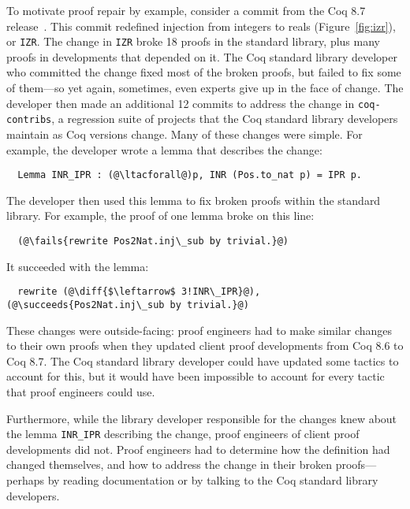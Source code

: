 To motivate proof repair by example, consider a commit from the Coq 8.7 release~\cite{coq87commit}.
This commit redefined injection from integers to reals (Figure~\ref{fig:izr}), or \lstinline{IZR}.
The change in \lstinline{IZR} broke 18 proofs in the standard library, plus many proofs in developments
that depended on it.
The Coq standard library developer who committed the change fixed most of the broken proofs,
but failed to fix some of them---so yet again, sometimes, even experts give up in the face of change. %
The developer then made an additional 12 commits to address the change in \lstinline{coq-contribs},
a regression suite of projects that the Coq standard library developers maintain as Coq versions change.
Many of these changes were simple. For example, the developer wrote a lemma that describes the change:

\lstset{language=coq, aboveskip=3pt, belowskip=3pt}
\begin{lstlisting}
  Lemma INR_IPR : (@\ltacforall@)p, INR (Pos.to_nat p) = IPR p.
\end{lstlisting}
The developer then used this lemma to fix broken proofs within the standard library. 
For example, the proof of one lemma broke on this line: %

\begin{lstlisting}
  (@\fails{rewrite Pos2Nat.inj\_sub by trivial.}@)
\end{lstlisting}
It succeeded with the lemma:

\begin{lstlisting}
  rewrite (@\diff{$\leftarrow$ 3!INR\_IPR}@), (@\succeeds{Pos2Nat.inj\_sub by trivial.}@)
\end{lstlisting}
These changes were outside-facing: proof engineers had to make similar changes to their own proofs when
they updated client proof developments from Coq 8.6 to Coq 8.7.
The Coq standard library developer could have updated some tactics to account for this, but it 
would have been impossible to account for every tactic that proof engineers could use.

Furthermore, while the library developer responsible for the changes knew about the lemma \lstinline{INR_IPR}
describing the change, proof engineers of client proof developments did not. Proof engineers
had to determine how the definition had changed themselves, and how to address the change in their broken proofs---perhaps 
by reading documentation or by talking to the Coq standard library developers. 

